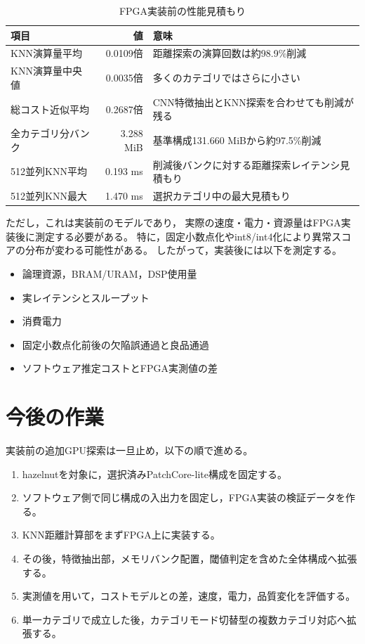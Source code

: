\documentclass[uplatex,dvipdfmx,a4paper,11pt]{jsarticle}
\begin{document}
\begin{table}[t]
  \centering
  \caption{FPGA実装前の性能見積もり}
  \label{tab:fpga-estimate}
  \begin{tabular}{lrp{78mm}}
    \toprule
    項目 & 値 & 意味 \\
    \midrule
    KNN演算量平均 & 0.0109倍 & 距離探索の演算回数は約98.9\%削減 \\
    KNN演算量中央値 & 0.0035倍 & 多くのカテゴリではさらに小さい \\
    総コスト近似平均 & 0.2687倍 & CNN特徴抽出とKNN探索を合わせても削減が残る \\
    全カテゴリ分バンク & 3.288 MiB & 基準構成131.660 MiBから約97.5\%削減 \\
    512並列KNN平均 & 0.193 ms & 削減後バンクに対する距離探索レイテンシ見積もり \\
    512並列KNN最大 & 1.470 ms & 選択カテゴリ中の最大見積もり \\
    \bottomrule
  \end{tabular}
\end{table}

ただし，これは実装前のモデルであり，
実際の速度・電力・資源量はFPGA実装後に測定する必要がある。
特に，固定小数点化やint8/int4化により異常スコアの分布が変わる可能性がある。
したがって，実装後には以下を測定する。

\begin{itemize}
  \item 論理資源，BRAM/URAM，DSP使用量
  \item 実レイテンシとスループット
  \item 消費電力
  \item 固定小数点化前後の欠陥誤通過と良品通過
  \item ソフトウェア推定コストとFPGA実測値の差
\end{itemize}

\section{今後の作業}

実装前の追加GPU探索は一旦止め，以下の順で進める。

\begin{enumerate}
  \item hazelnutを対象に，選択済みPatchCore-lite構成を固定する。
  \item ソフトウェア側で同じ構成の入出力を固定し，FPGA実装の検証データを作る。
  \item KNN距離計算部をまずFPGA上に実装する。
  \item その後，特徴抽出部，メモリバンク配置，閾値判定を含めた全体構成へ拡張する。
  \item 実測値を用いて，コストモデルとの差，速度，電力，品質変化を評価する。
  \item 単一カテゴリで成立した後，カテゴリモード切替型の複数カテゴリ対応へ拡張する。
\end{enumerate}
\end{document}
